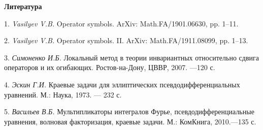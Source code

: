 \smallskip \centerline {\bf Литература} \nopagebreak

1. {\it Vasilyev V.B.} Operator symbols. ArXiv: Math.FA/1901.06630, pp. 1--11.

2. {\it Vasilyev V.B.} Operator symbols. II. ArXiv: Math.FA/1911.08099, pp. 1--13.

3. {\it Симоненко И.Б.} Локальный метод в теории инвариантных относительно сдвига операторов и их огибающих. Ростов-на-Дону, ЦВВР, 2007. ---120 с.

4. {\it Эскин Г.И.} Краевые задачи для эллиптических псевдодифференциальных уравнений. М.: Наука, 1973. — 232 с.

5. {\it Васильев В.Б.} Мультипликаторы интегралов Фурье, псевдодифференциальные уравнения, волновая факторизация, краевые задачи. М.: КомКнига, 2010.---135 с.
